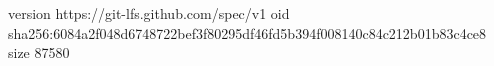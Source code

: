 version https://git-lfs.github.com/spec/v1
oid sha256:6084a2f048d6748722bef3f80295df46fd5b394f008140c84c212b01b83c4ce8
size 87580
